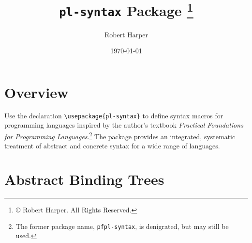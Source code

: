 \documentclass[11pt]{article}
\title{\texttt{pl-syntax} Package%
\footnote{\copyright{} \the\year{} Robert Harper.  All Rights Reserved.}}
\author{Robert Harper}
\date{\today}
\begin{document}
\maketitle{}

\section*{Overview\footnotemark}

Use the declaration \verb|\usepackage{pl-syntax}| to define syntax macros for programming languages inspired by the author's textbook \textit{Practical Foundations for Programming Languages}.\footnote{The former package name, \texttt{pfpl-syntax}, is denigrated, but may still be used.}  The package provides an integrated, systematic treatment of abstract and concrete syntax for a wide range of languages.


\section*{Abstract Binding Trees}
\end{document}
